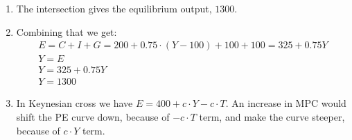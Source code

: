 \documentclass[a4paper,12pt]{article} %
\begin{document}
\begin{enumerate}
\begin{enumerate} [label=\arabic*)]
\begin{tikzpicture}[domain=0:5,scale=1,thick]
\end{tikzpicture}


In the Keynesian cross diagram,  equilibrium occurs, where planned expenditure curve (shown in blue) intersects  a line that represents the equality of total income and output (shown in red). At this point total demand, PE, equals the total amount of national output, Y, so total demand equals total supply.

\item 
The intersection gives the equilibrium output, $ 1300 $.

\item 
Combining that we get: 
\begin{gather*}
E = C + I + G = 200 + 0.75 \cdot (Y - 100) + 100 + 100 = 325 + 0.75Y\\
Y = E \\
Y = 325 + 0.75Y\\
Y = 1300
\end{gather*}

\newpage

\item In Keynesian cross we have $ E = 400 + c\cdot Y - c \cdot T $.
An increase in MPC would shift the PE curve down, because of $- c \cdot T $ term, and make the curve steeper, because of $ c\cdot Y $ term. 


\end{enumerate}
\end{enumerate}
\end{document}
